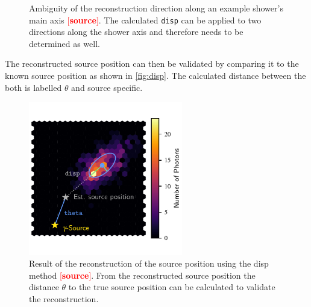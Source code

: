 \begin{figure}
\begin{subfigure}{0.5\textwidth}
  \end{subfigure}
  \caption{Ambiguity of the reconstruction direction along an example shower's main axis \textcolor{red}{[\textbf{source}]}. The calculated \texttt{disp} can be applied to two directions along the shower axis and therefore needs to be determined as well.}
  \label{fig:disp_amb}
\end{figure}
%
The reconstructed source position can then be validated by comparing it to the
known source position as shown in \autoref{fig:disp}. The calculated distance
between the both is labelled $\theta$ and source specific.
%
\begin{figure}
  \centering%
  \includegraphics[width=0.6\textwidth]{Plots/hillas_disp.pdf}%
  \caption{Result of the reconstruction of the source position using the disp method \textcolor{red}{[\textbf{source}]}. From the reconstructed source position the distance $\theta$ to the true source position can be calculated to validate the reconstruction.}%
  \label{fig:disp}%
\end{figure}
%
